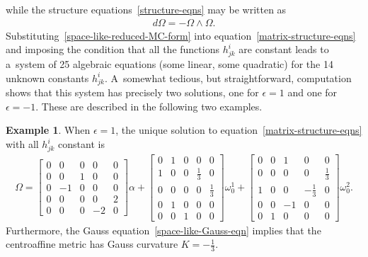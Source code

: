 \documentclass[pdftex]{sigma}
\numberwithin{equation}{section}
\theoremstyle{definition}
\newtheorem{exmpl}[teo]{Example}
\begin{document}
while the structure equations~\eqref{structure-eqns} may be written as
\begin{gather}
d\Omega = - \Omega \wedge \Omega.
\label{matrix-structure-eqns}
\end{gather}
Substituting~\eqref{space-like-reduced-MC-form} into equation~\eqref{matrix-structure-eqns} and imposing the condition
that all the functions $h^i_{jk}$ are constant leads to a~system of 25 algebraic equations (some linear, some quadratic)
for the 14 unknown constants $h^i_{jk}$.
A~somewhat tedious, but straightforward, computation shows that this system has precisely two solutions, one for
$\epsilon=1$ and one for $\epsilon=-1$.
These are described in the following two examples.

\begin{exmpl}
\label{space-like-epsilon-plus-one}
When $\epsilon=1$, the unique solution to equation~\eqref{matrix-structure-eqns} with all $h^i_{jk}$ constant is
\begin{gather}
\Omega =
\begin{bmatrix}
0 & 0 & 0 & 0 & 0
\\
0 & 0 & 1 & 0 & 0
\\
0 & -1 & 0 & 0 & 0
\\
0 & 0 & 0 & 0 & 2
\\
0 & 0 & 0 & -2 & 0
\end{bmatrix}
\alpha +
\begin{bmatrix}
0 & 1 & 0 & 0 & 0
\\
1 & 0 & 0 & \tfrac{1}{3} & 0
\\
0 & 0 & 0 & 0 & \tfrac{1}{3}
\\
0 & 1 & 0 & 0 & 0
\\
0 & 0 & 1 & 0 & 0
\end{bmatrix}
\omega^1_0 +
\begin{bmatrix}
0 & 0 & 1 & 0 & 0
\\
0 & 0 & 0 & 0 & \tfrac{1}{3}
\\
1 & 0 & 0 & -\tfrac{1}{3} & 0
\\
0 & 0 & -1 & 0 & 0
\\
0 & 1 & 0 & 0 & 0
\end{bmatrix}
\omega^2_0.
\label{space-like-epsilon-plus-one-MC-form}
\end{gather}
Furthermore, the Gauss equation~\eqref{space-like-Gauss-eqn} implies that the centroaf\/f\/ine metric has Gauss curvature $K
= -\tfrac{1}{3}$.


\end{exmpl}
\end{document}
